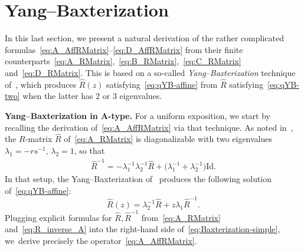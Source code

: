 \documentclass[pdftex]{sigma}
\numberwithin{equation}{section}
\newcommand{\Id}{\mathrm{Id}}
\begin{document}
\section{Yang--Baxterization}\label{sec:Baxterization}

In this last section, we present a natural derivation of the rather complicated formulas~\eqref{eq:A_AffRMatrix}--\eqref{eq:D_AffRMatrix} from their finite counterparts~\eqref{eq:A_RMatrix},~\eqref{eq:B_RMatrix},~\eqref{eq:C_RMatrix} and~\eqref{eq:D_RMatrix}. This is based on a so-called \emph{Yang--Baxterization} technique of~\cite{GWX}, which produces $\hat{R}(z)$ satisfying~\eqref{eq:qYB-affine} from $\hat{R}$ satisfying~\eqref{eq:qYB-two} when the latter has $2$ or $3$ eigenvalues.


\textbf{Yang--Baxterization in $\boldsymbol{A}$-type.}
For a uniform exposition, we start by recalling the derivation of~\eqref{eq:A_AffRMatrix} via that technique. As noted in~\cite{BW2}, the $R$-matrix $\hat{R}$ of~\eqref{eq:A_RMatrix} is diagonalizable with two eigenvalues $\lambda_1=-rs^{-1}$, $\lambda_2=1$, so that
\begin{gather}
 \hat{R}^{-1}=-\lambda_1^{-1}\lambda_2^{-1}\hat{R}+\bigl(\lambda^{-1}_1+\lambda^{-1}_2\bigr)\Id.\label{eq:R_inverse_A}
\end{gather}
In that setup, the Yang--Baxterization of~\cite[equation~(3.15)]{GWX} produces the following solution of~\eqref{eq:qYB-affine}:
\begin{equation}\label{eq:Baxterization-simple}
 \hat{R}(z)=\lambda_2^{-1}\hat{R} + z\lambda_1 \hat{R}^{-1}.
\end{equation}
Plugging explicit formulas for $\hat{R},\hat{R}^{-1}$ from~\eqref{eq:A_RMatrix} and~\eqref{eq:R_inverse_A} into the right-hand side of~\eqref{eq:Baxterization-simple},
we~derive precisely the operator~\eqref{eq:A_AffRMatrix}.
\end{document}
